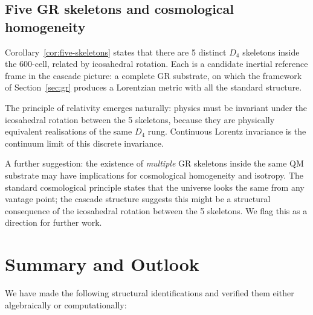 \documentclass[12pt]{article}
\begin{document}
\subsection{Five GR skeletons and cosmological homogeneity}

Corollary~\ref{cor:five-skeletons} states that there are 5 distinct $D_4$ skeletons inside the 600-cell, related by icosahedral rotation. Each is a candidate inertial reference frame in the cascade picture: a complete GR substrate, on which the framework of Section~\ref{sec:gr} produces a Lorentzian metric with all the standard structure.

The principle of relativity emerges naturally: physics must be invariant under the icosahedral rotation between the 5 skeletons, because they are physically equivalent realisations of the same $D_4$ rung. Continuous Lorentz invariance is the continuum limit of this discrete invariance.

A further suggestion: the existence of \emph{multiple} GR skeletons inside the same QM substrate may have implications for cosmological homogeneity and isotropy. The standard cosmological principle states that the universe looks the same from any vantage point; the cascade structure suggests this might be a structural consequence of the icosahedral rotation between the 5 skeletons. We flag this as a direction for further work.

\section{Summary and Outlook}\label{sec:summary}

We have made the following structural identifications and verified them either algebraically or computationally:
\end{document}
